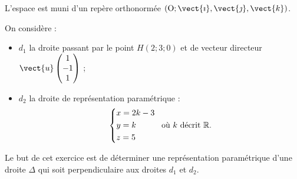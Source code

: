 L'espace est muni d'un repère orthonormée $\left(\text{O};\vect{\imath},\vect{\jmath},\vect{k}\right)$.

On considère :

\begin{itemize}
	\item $d_1$ la droite passant par le point $H(2;3;0)$ et de vecteur directeur $\vect{u}\begin{pmatrix}1\\-1\\1\end{pmatrix}$ ;
	\item $d_2$  la droite de représentation paramétrique : \[ \begin{dcases}x=2k-3\\y=k\\z=5\end{dcases} \: \text{ où } k \text{ décrit } \mathbb{R}.\]
\end{itemize}

Le but de cet exercice est de déterminer une représentation paramétrique d'une droite $\Delta$ qui soit perpendiculaire aux droites $d_1$ et $d_2$.

